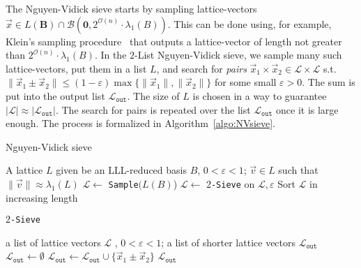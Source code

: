 The Nguyen-Vidick sieve starts by sampling lattice-vectors $\vec x \in L(\mathbf{B}) \cap \mathcal{B}(\mathbf{0}, 2^{\mathcal{O}(n)} \cdot \lambda_1(B))$. This can be done using, for example, Klein's sampling procedure~\cite{Klein00} that outputs a lattice-vector of length not greater than $2^{\mathcal{O}(n)} \cdot \lambda_1(B)$.  In the $2$-List Nguyen-Vidick sieve, we sample many such lattice-vectors, put them in a list $L$, and search for \emph{pairs} $\vec x_1 \times \vec x_2 \in \mathcal{L} \times \mathcal{L}$ s.t. $\| \vec x_1 \pm \vec x_2 \| \leq (1-\varepsilon) \max\{\| \vec x_1 \|, \| \vec x_2 \|\}$ for some small $\varepsilon>0$. The sum is put into the output list $\mathcal{L}_{\mathtt{out}}$. The size of $L$ is chosen in a way to guarantee $|{\mathcal{L}}| \approx |\mathcal{L}_{\mathtt{out}}|$. The search for pairs is repeated over the list $\mathcal{L}_{\mathtt{out}}$ once it is large enough.  The process is formalized in Algorithm~\ref{algo:NVsieve}.


\begin{algorithm}
	\caption{Nguyen-Vidick sieve~\cite{NV08}}
	\label{algo:NVsieve}
	\begin{algorithmic}[1]
		\REQUIRE A lattice $L$ given be an LLL-reduced basis $B$, $0 < \varepsilon < 1$;
		\ENSURE $\vec v \in L$ such that $\|\vec v\| \approx  \lambda_1(L)$  \vspace{1mm}
		\STATE $\mathcal{L} \gets$ \texttt{Sample}$(L(B)$)  
		\STATE $\mathcal{L} \gets $ 	\texttt{$2$-Sieve} on $\mathcal{L}, \varepsilon$
		\STATE Sort $\mathcal{L}$ in increasing length
		\ENDWHILE
	\end{algorithmic}

	\vspace{5mm}

	\texttt{$2$-Sieve}
	\begin{algorithmic}[1]
		\REQUIRE  a list of lattice vectors $\mathcal{L}$ , $0 < \varepsilon < 1$;
		\ENSURE  a list of shorter lattice vectors $\mathcal{L}_{\mathtt{out}} $ \vspace{1mm}
		\STATE $\mathcal{L}_{\mathtt{out}} \gets \emptyset$
		\STATE $\mathcal{L}_{\mathtt{out}} \gets \mathcal{L}_{\mathtt{out}}  \cup \{ \vec x_1 \pm \vec x_2  \}$ 		
		\ENDIF
		\ENDFOR
		\RETURN $\mathcal{L}_{\mathtt{out}}$
	\end{algorithmic}

\end{algorithm} 

